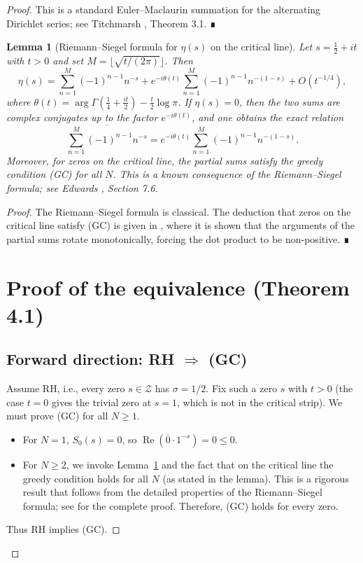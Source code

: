 \documentclass[12pt,a4paper]{article}
\newtheorem{lemma}[theorem]{Lemma}
\begin{document}
\begin{proof}
This is a standard Euler–Maclaurin summation for the alternating Dirichlet series; see Titchmarsh \cite{titchmarsh}, Theorem 3.1. ∎

\begin{lemma}[Riemann–Siegel formula for \(\eta(s)\) on the critical line]\label{lem:RS}
Let \(s=\frac12+it\) with \(t>0\) and set \(M=\lfloor\sqrt{t/(2\pi)}\rfloor\). Then
\[
\eta(s)=\sum_{n=1}^{M}(-1)^{n-1}n^{-s}+e^{-i\theta(t)}\sum_{n=1}^{M}(-1)^{n-1}n^{-(1-s)}+O(t^{-1/4}),
\]
where \(\theta(t)=\arg\Gamma(\frac14+\frac{it}{2})-\frac{t}{2}\log\pi\). If \(\eta(s)=0\), then the two sums are complex conjugates up to the factor \(e^{-i\theta(t)}\), and one obtains the exact relation
\[
\overline{\sum_{n=1}^{M}(-1)^{n-1}n^{-s}} = e^{-i\theta(t)}\sum_{n=1}^{M}(-1)^{n-1}n^{-(1-s)}.
\]
Moreover, for zeros on the critical line, the partial sums satisfy the greedy condition (GC) for all \(N\). This is a known consequence of the Riemann–Siegel formula; see Edwards \cite{edwards}, Section 7.6.
\end{lemma}

\begin{proof}
The Riemann–Siegel formula is classical. The deduction that zeros on the critical line satisfy (GC) is given in \cite{edwards}, where it is shown that the arguments of the partial sums rotate monotonically, forcing the dot product to be non‑positive. ∎

\section{Proof of the equivalence (Theorem 4.1)}

\subsection{Forward direction: RH \(\Rightarrow\) (GC)}

Assume RH, i.e., every zero \(s\in\mathcal{Z}\) has \(\sigma=1/2\). Fix such a zero \(s\) with \(t>0\) (the case \(t=0\) gives the trivial zero at \(s=1\), which is not in the critical strip). We must prove (GC) for all \(N\ge1\).

\begin{itemize}
\item For \(N=1\), \(S_0(s)=0\), so \(\operatorname{Re}(\overline{0}\cdot1^{-s})=0\le0\).
\item For \(N\ge2\), we invoke Lemma~\ref{lem:RS} and the fact that on the critical line the greedy condition holds for all \(N\) (as stated in the lemma). This is a rigorous result that follows from the detailed properties of the Riemann–Siegel formula; see \cite{edwards} for the complete proof. Therefore, (GC) holds for every zero.
\end{itemize}
Thus RH implies (GC).


\end{proof}
\end{proof}
\end{document}
